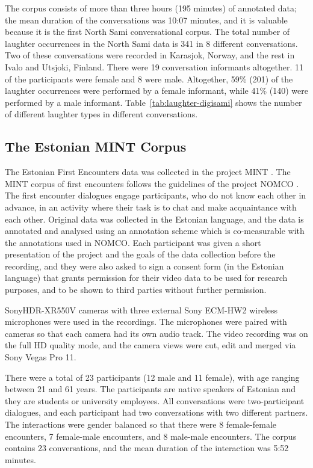 \documentclass[10pt,journal,compsoc]{IEEEtran}
\begin{document}
The corpus consists of more than three hours (195 minutes) of annotated data; the mean duration of the conversations was 10:07 minutes, and it is valuable because it is the first North Sami conversational corpus. The total number of laughter occurrences in the North Sami data is 341 in 8 different conversations. Two of these conversations were recorded in Karasjok, Norway, and the rest in Ivalo and Utsjoki, Finland. There were 19 conversation informants altogether. 11 of the participants were female and 8 were male. Altogether, 59\% (201) of the laughter occurrences were performed by a female informant, while 41\% (140) were performed by a male informant. Table~\ref{tab:laughter-digisami} shows the number of different laughter types in different conversations.

\subsection{The Estonian MINT Corpus}
\label{sec:estonian-mint-corpus}

The Estonian First Encounters data was collected in the project MINT \cite{Jokinen:Tenjes:12}. The MINT corpus of first encounters follows the guidelines of the project NOMCO \cite{Paggio:ea:10}. The first encounter dialogues engage participants, who do not know each other in advance, in an activity where their task is to chat and make acquaintance with each other. Original data was collected in the Estonian language, and the data is annotated and analysed using an annotation scheme which is co-measurable with the annotations used in NOMCO. Each participant was given a short presentation of the project and the goals of the data collection before the recording, and they were also asked to sign a consent form (in the Estonian language) that grants permission for their video data to be used for research purposes, and to be shown to third parties without further permission.

SonyHDR-XR550V cameras with three external Sony ECM-HW2 wireless microphones were used in the recordings. The microphones were paired with cameras so that each camera had its own audio track. The video recording was on the full HD quality mode, and the camera views were cut, edit and merged via Sony Vegas Pro 11.

There were a total of 23 participants (12 male and 11 female), with age ranging between 21 and 61 years. The participants are native speakers of Estonian and they are students or university employees. All conversations were two-participant dialogues, and each participant had two conversations with two different partners. The interactions were gender balanced so that there were 8 female-female encounters, 7 female-male encounters, and 8 male-male encounters. The corpus contains 23 conversations, and the mean duration of the interaction was 5:52 minutes.
\end{document}
